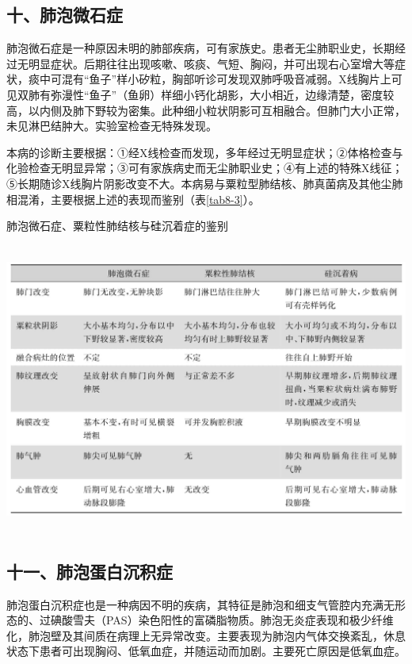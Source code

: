 \subsection{十、肺泡微石症}

肺泡微石症是一种原因未明的肺部疾病，可有家族史。患者无尘肺职业史，长期经过无明显症状。后期往往出现咳嗽、咳痰、气短、胸闷，并可出现右心室增大等症状，痰中可混有“鱼子”样小矽粒，胸部听诊可发现双肺呼吸音减弱。X线胸片上可见双肺有弥漫性“鱼子”（鱼卵）样细小钙化胡影，大小相近，边缘清楚，密度较高，以内侧及肺下野较为密集。此种细小粒状阴影可互相融合。但肺门大小正常，未见淋巴结肿大。实验室检查无特殊发现。

本病的诊断主要根据：①经X线检查而发现，多年经过无明显症状；②体格检查与化验检查无明显异常；③可有家族病史而无尘肺职业史；④有上述的特殊X线征；⑤长期随诊X线胸片阴影改变不大。本病易与粟粒型肺结核、肺真菌病及其他尘肺相混淆，主要根据上述的表现而鉴别（表\ref{tab8-3}）。

\begin{table}[htbp]
\centering
\caption{肺泡微石症、粟粒性肺结核与硅沉着症的鉴别}
\label{tab8-3}
\includegraphics[width=5.9375in,height=3.78125in]{./images/Image00064.jpg}
\end{table}

\subsection{十一、肺泡蛋白沉积症}

肺泡蛋白沉积症也是一种病因不明的疾病，其特征是肺泡和细支气管腔内充满无形态的、过碘酸雪夫（PAS）染色阳性的富磷脂物质。肺泡无炎症表现和极少纤维化，肺泡壁及其间质在病理上无异常改变。主要表现为肺泡内气体交换紊乱，休息状态下患者可出现胸闷、低氧血症，并随运动而加剧。主要死亡原因是低氧血症。

